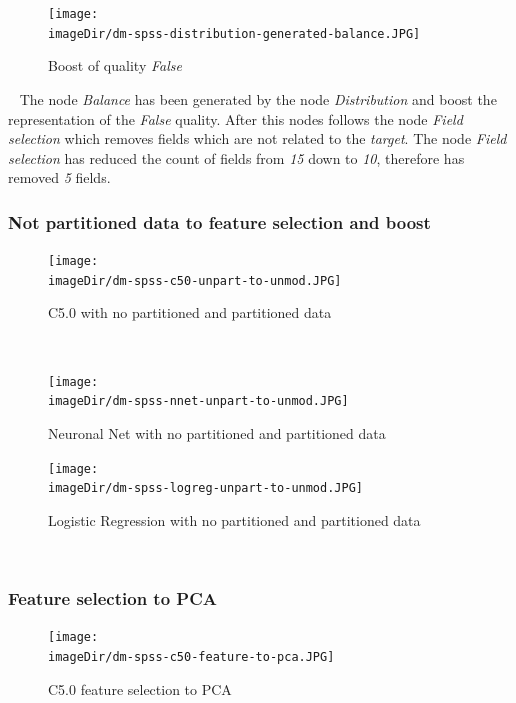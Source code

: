 \documentclass[11pt, a4paper, twoside]{article}   	%
\newcommand{\imageDir}{./images/}
\begin{document}
\begin{figure}[h]
\centering
\texttt{[image: \\imageDir/dm-spss-distribution-generated-balance.JPG]}
\caption{Boost of quality \emph{False}}
\end{figure}
\ \newline
The node \emph{Balance} has been generated by the node \emph{Distribution} and boost the representation of the \emph{False} quality. After this nodes follows the node \emph{Field selection} which removes fields which are not related to the \emph{target}. 
\newline
\newline
The node \emph{Field selection} has reduced the count of fields from \emph{15} down to \emph{10}, therefore has removed \emph{5} fields.
\newline
\newline

\subsubsection{Not partitioned data to feature selection and boost}
\begin{figure}[h]
\centering
\texttt{[image: \\imageDir/dm-spss-c50-unpart-to-unmod.JPG]}
\caption{C5.0 with no partitioned and partitioned data}
\end{figure}
\ \newpage

\begin{figure}[h]
\centering
\texttt{[image: \\imageDir/dm-spss-nnet-unpart-to-unmod.JPG]}
\caption{Neuronal Net with no partitioned and partitioned data}
\end{figure}

\begin{figure}[h]
\centering
\texttt{[image: \\imageDir/dm-spss-logreg-unpart-to-unmod.JPG]}
\caption{Logistic Regression with no partitioned and partitioned data}
\end{figure}
\ \newpage

\subsubsection{Feature selection to PCA}
\begin{figure}[h]
\centering
\texttt{[image: \\imageDir/dm-spss-c50-feature-to-pca.JPG]}
\caption{C5.0 feature selection to PCA}
\end{figure}
\end{document}
